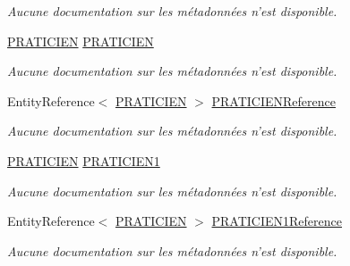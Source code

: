 \begin{DoxyCompactItemize}
\begin{DoxyCompactList}\small\item\em Aucune documentation sur les métadonnées n'est disponible. \end{DoxyCompactList}\item 
\hyperlink{class_model_1_1_p_r_a_t_i_c_i_e_n}{P\-R\-A\-T\-I\-C\-I\-E\-N} \hyperlink{class_model_1_1_r_e_m_p_l_a_c_e_ae390942d049897645a0751dda7578846}{P\-R\-A\-T\-I\-C\-I\-E\-N}
\begin{DoxyCompactList}\small\item\em Aucune documentation sur les métadonnées n'est disponible. \end{DoxyCompactList}\item 
Entity\-Reference$<$ \hyperlink{class_model_1_1_p_r_a_t_i_c_i_e_n}{P\-R\-A\-T\-I\-C\-I\-E\-N} $>$ \hyperlink{class_model_1_1_r_e_m_p_l_a_c_e_ae00edbfe75242bb1d02e1315c5cdacd8}{P\-R\-A\-T\-I\-C\-I\-E\-N\-Reference}
\begin{DoxyCompactList}\small\item\em Aucune documentation sur les métadonnées n'est disponible. \end{DoxyCompactList}\item 
\hyperlink{class_model_1_1_p_r_a_t_i_c_i_e_n}{P\-R\-A\-T\-I\-C\-I\-E\-N} \hyperlink{class_model_1_1_r_e_m_p_l_a_c_e_a4a071b1a7be7992a57e0f67876808145}{P\-R\-A\-T\-I\-C\-I\-E\-N1}
\begin{DoxyCompactList}\small\item\em Aucune documentation sur les métadonnées n'est disponible. \end{DoxyCompactList}\item 
Entity\-Reference$<$ \hyperlink{class_model_1_1_p_r_a_t_i_c_i_e_n}{P\-R\-A\-T\-I\-C\-I\-E\-N} $>$ \hyperlink{class_model_1_1_r_e_m_p_l_a_c_e_a57e1924ffc9f114166ef3cd638f600af}{P\-R\-A\-T\-I\-C\-I\-E\-N1\-Reference}
\begin{DoxyCompactList}\small\item\em Aucune documentation sur les métadonnées n'est disponible. \end{DoxyCompactList}\end{DoxyCompactItemize}


